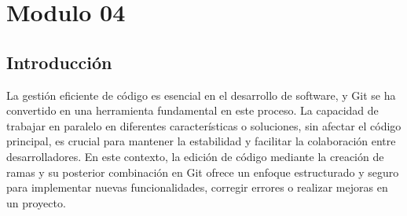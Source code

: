 \section{Modulo 04}


\subsection*{Introducción}

La gestión eficiente de código es esencial en el desarrollo de software, y Git se ha
convertido en una herramienta fundamental en este proceso. La capacidad de trabajar
en paralelo en diferentes características o soluciones, sin afectar el código principal, 
es crucial para mantener la estabilidad y facilitar la colaboración entre desarrolladores. 
En este contexto, la edición de código mediante la creación de ramas y su posterior 
combinación en Git ofrece un enfoque estructurado y seguro para implementar nuevas 
funcionalidades, corregir errores o realizar mejoras en un proyecto.

